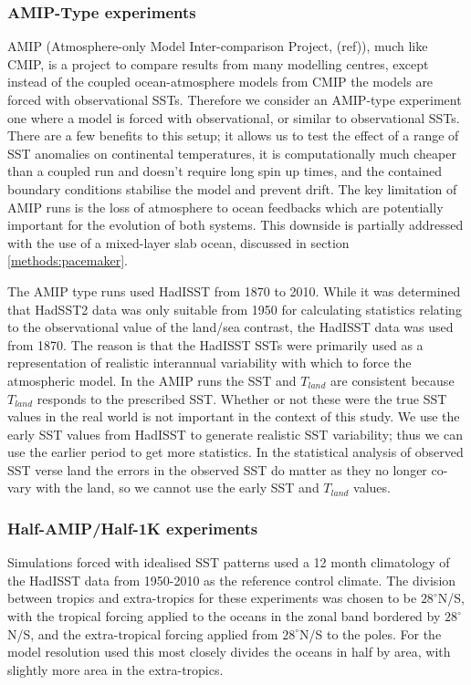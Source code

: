 \subsubsection{AMIP-Type experiments}\label{methods:amip}
AMIP (Atmosphere-only Model Inter-comparison Project, (ref)), much like CMIP, is 
a project to compare results from many modelling centres, except instead of the 
coupled ocean-atmosphere models from CMIP the models are forced with 
observational SSTs.  Therefore we consider an AMIP-type experiment one where a 
model is forced with observational, or similar to observational SSTs. There are 
a few benefits to this setup; it allows us to test the effect of a range of SST 
anomalies on continental temperatures, it is computationally much cheaper than a 
coupled run and doesn't require long spin up times, and the contained boundary 
conditions stabilise the model and prevent drift. The key limitation of AMIP 
runs is the loss of atmosphere to ocean feedbacks which are potentially 
important for the evolution of both systems. This downside is partially 
addressed with the use of a mixed-layer slab ocean, discussed in section 
\ref{methods:pacemaker}.

The AMIP type runs used HadISST from 1870 to 2010. While it was determined that 
HadSST2 data was only suitable from 1950 for calculating statistics relating to 
the observational value of the land/sea contrast, the HadISST data was used from 
1870. The reason is that the HadISST SSTs were primarily used as a 
representation of realistic interannual variability with which to force the 
atmospheric model.  In the AMIP runs the SST and $T_{land}$ are consistent 
because $T_{land}$ responds to the prescribed SST.  Whether or not these were 
the true SST values in the real world is not important in the context of this 
study.  We use the early SST values from HadISST to generate realistic SST 
variability; thus we can use the earlier period to get more statistics. In the 
statistical analysis of observed SST verse land the errors in the observed SST 
do matter as they no longer co-vary with the land, so we cannot use the early 
SST and $T_{land}$ values.

\subsubsection{Half-AMIP/Half-1K experiments}
Simulations forced with idealised SST patterns used a 12 month climatology of 
the HadISST data from 1950-2010 as the reference control climate. The division 
between tropics and extra-tropics for these experiments was chosen to be 
$28^{\circ}$N/S, with the tropical forcing applied to the oceans in the zonal 
band bordered by $28^{\circ}$N/S, and the extra-tropical forcing applied from 
$28^{\circ}$N/S to the poles. For the model resolution used this most closely 
divides the oceans in half by area, with slightly more area in the 
extra-tropics.

